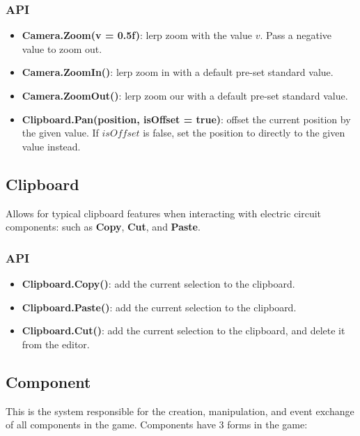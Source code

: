 \documentclass[../main.tex]{subfiles}
\begin{document}
\subsubsection*{API}
\begin{itemize}
    \item \textbf{Camera.Zoom(v = 0.5f)}: lerp zoom with the value \(v\). Pass a negative value to zoom out.
    \item \textbf{Camera.ZoomIn()}: lerp zoom in with a default pre-set standard value.
    \item \textbf{Camera.ZoomOut()}: lerp zoom our with a default pre-set standard value.
    \item \textbf{Clipboard.Pan(position, isOffset = true)}: offset the current position by the given value. If \(isOffset\) is false, set the position to directly to the given value instead.
\end{itemize}


\subsection{Clipboard}
Allows for typical clipboard features when interacting with electric circuit components: such as \textbf{Copy}, \textbf{Cut}, and \textbf{Paste}. 
\subsubsection*{API}
\begin{itemize}
    \item \textbf{Clipboard.Copy()}: add the current selection to the clipboard.
    \item \textbf{Clipboard.Paste()}: add the current selection to the clipboard.
    \item \textbf{Clipboard.Cut()}: add the current selection to the clipboard, and delete it from the editor.
\end{itemize}

\subsection{Component}
This is the system responsible for the creation, manipulation, and event exchange of all components in the game. Components have 3 forms in the game:
\end{document}
